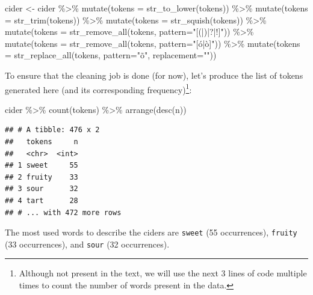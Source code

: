 \documentclass[
]{krantz}
\makeatletter
\newenvironment{Shaded}{\begin{snugshade}}{\end{snugshade}}
\newcommand{\AttributeTok}[1]{\textcolor[rgb]{0.61,0.61,0.61}{#1}}
\newcommand{\FunctionTok}[1]{\textcolor[rgb]{0,0,0}{#1}}
\newcommand{\NormalTok}[1]{#1}
\newcommand{\OtherTok}[1]{\textcolor[rgb]{0.37,0.37,0.37}{#1}}
\newcommand{\SpecialCharTok}[1]{\textcolor[rgb]{0,0,0}{#1}}
\newcommand{\StringTok}[1]{\textcolor[rgb]{0.5,0.5,0.5}{#1}}
\newenvironment{kframe}{%
\medskip{}
\setlength{\fboxsep}{.8em}
 \def\at@end@of@kframe{}%
 \ifinner\ifhmode%
  \def\at@end@of@kframe{\end{minipage}}%
  \begin{minipage}{\columnwidth}%
 \fi\fi%
 \def\FrameCommand##1{\hskip\@totalleftmargin \hskip-\fboxsep
 \colorbox{shadecolor}{##1}\hskip-\fboxsep
     \hskip-\linewidth \hskip-\@totalleftmargin \hskip\columnwidth}%
 \MakeFramed {\advance\hsize-\width
   \@totalleftmargin\z@ \linewidth\hsize
   \@setminipage}}%
 {\par\unskip\endMakeFramed%
 \at@end@of@kframe}
\renewenvironment{Shaded}{\begin{kframe}}{\end{kframe}}
\makeatother
\begin{document}
\begin{Shaded}
\begin{Highlighting}[]
\NormalTok{cider }\OtherTok{\textless{}{-}}\NormalTok{ cider }\SpecialCharTok{\%\textgreater{}\%} 
  \FunctionTok{mutate}\NormalTok{(}\AttributeTok{tokens =} \FunctionTok{str\_to\_lower}\NormalTok{(tokens)) }\SpecialCharTok{\%\textgreater{}\%} 
  \FunctionTok{mutate}\NormalTok{(}\AttributeTok{tokens =} \FunctionTok{str\_trim}\NormalTok{(tokens)) }\SpecialCharTok{\%\textgreater{}\%} 
  \FunctionTok{mutate}\NormalTok{(}\AttributeTok{tokens =} \FunctionTok{str\_squish}\NormalTok{(tokens)) }\SpecialCharTok{\%\textgreater{}\%} 
  \FunctionTok{mutate}\NormalTok{(}\AttributeTok{tokens =} \FunctionTok{str\_remove\_all}\NormalTok{(tokens, }\AttributeTok{pattern=}\StringTok{"[(|)|?|!]"}\NormalTok{)) }\SpecialCharTok{\%\textgreater{}\%} 
  \FunctionTok{mutate}\NormalTok{(}\AttributeTok{tokens =} \FunctionTok{str\_remove\_all}\NormalTok{(tokens, }\AttributeTok{pattern=}\StringTok{"[ó|ò]"}\NormalTok{)) }\SpecialCharTok{\%\textgreater{}\%} 
  \FunctionTok{mutate}\NormalTok{(}\AttributeTok{tokens =} \FunctionTok{str\_replace\_all}\NormalTok{(tokens, }\AttributeTok{pattern=}\StringTok{"õ"}\NormalTok{, }\AttributeTok{replacement=}\StringTok{"\textquotesingle{}"}\NormalTok{))}
\end{Highlighting}
\end{Shaded}

To ensure that the cleaning job is done (for now), let's produce the list of tokens generated here (and its corresponding frequency)\footnote{Although not present in the text, we will use the next 3 lines of code multiple times to count the number of words present in the data.}:

\begin{Shaded}
\begin{Highlighting}[]
\NormalTok{cider }\SpecialCharTok{\%\textgreater{}\%} 
  \FunctionTok{count}\NormalTok{(tokens) }\SpecialCharTok{\%\textgreater{}\%} 
  \FunctionTok{arrange}\NormalTok{(}\FunctionTok{desc}\NormalTok{(n))}
\end{Highlighting}
\end{Shaded}

\begin{verbatim}
## # A tibble: 476 x 2
##   tokens     n
##   <chr>  <int>
## 1 sweet     55
## 2 fruity    33
## 3 sour      32
## 4 tart      28
## # ... with 472 more rows
\end{verbatim}

The most used words to describe the ciders are \texttt{sweet} (55 occurrences), \texttt{fruity} (33 occurrences), and \texttt{sour} (32 occurrences).
\end{document}
